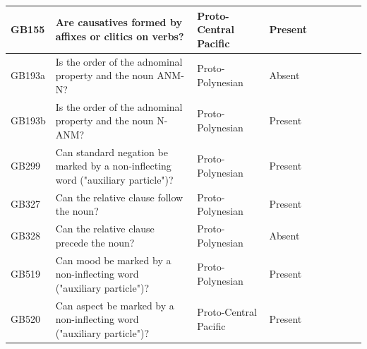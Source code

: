 \documentclass[a4paper,10pt]{article} %
\begin{document}
\begin{landscape}
\begin{longtable}{| p{2cm}| p{3cm}| p{2.5cm}|p{2cm}|p{2cm}|p{2cm}|p{2cm}|p{2cm}|p{2cm}|}
GB155&Are causatives formed by affixes or clitics on verbs?&Proto-Central Pacific&Present&\citet[352]{pawley1970change}& \cellcolor{hedvig_lightgreen!50}{True Positive} & \cellcolor{hedvig_lightgreen!50}{True Positive} & \cellcolor{hedvig_lightgreen!50}{True Positive} & \cellcolor{hedvig_lightgreen!50}{True Positive} \\ \hline
GB193a&Is the order of the adnominal property and the noun ANM-N?&Proto-Polynesian&Absent&\citet[xiv]{clark1976aspects}& \cellcolor{hedvig_lightgreen!50}{True Negative} & \cellcolor{hedvig_yellow!50}{True Negative} & \cellcolor{hedvig_yellow!50}{True Negative} & \cellcolor{hedvig_yellow!50}{True Negative} \\ \hline
GB193b&Is the order of the adnominal property and the noun N-ANM?&Proto-Polynesian&Present&\citet[495]{ross2004morphosyntactic}& \cellcolor{hedvig_lightgreen!50}{True Positive} & \cellcolor{hedvig_lightgreen!50}{True Positive} & \cellcolor{hedvig_lightgreen!50}{True Positive} & \cellcolor{hedvig_lightgreen!50}{True Positive} \\ \hline
GB299&Can standard negation be marked by a non-inflecting word ("auxiliary particle")?&Proto-Polynesian&Present&\citet[130]{clark1976aspects}& \cellcolor{hedvig_lightgreen!50}{True Positive} & \cellcolor{hedvig_lightgreen!50}{True Positive} & \cellcolor{hedvig_lightgreen!50}{True Positive} & \cellcolor{hedvig_lightgreen!50}{True Positive} \\ \hline
GB327&Can the relative clause follow the noun?&Proto-Polynesian&Present&\citet[74]{clark1976aspects}& \cellcolor{hedvig_lightgreen!50}{True Positive} & \cellcolor{hedvig_lightgreen!50}{True Positive} & \cellcolor{hedvig_lightgreen!50}{True Positive} & \cellcolor{hedvig_lightgreen!50}{True Positive} \\ \hline
GB328&Can the relative clause precede the noun?&Proto-Polynesian&Absent&\citet[74]{clark1976aspects}& \cellcolor{hedvig_lightgreen!50}{True Negative} & \cellcolor{hedvig_yellow!50}{True Negative} & \cellcolor{hedvig_yellow!50}{True Negative} & \cellcolor{hedvig_yellow!50}{True Negative} \\ \hline
GB519&Can mood be marked by a non-inflecting word ("auxiliary particle")?&Proto-Polynesian&Present&\citet[20]{chung1978}& \cellcolor{hedvig_lightgreen!50}{True Positive} & \cellcolor{hedvig_lightgreen!50}{True Positive} & \cellcolor{hedvig_lightgreen!50}{True Positive} & \cellcolor{hedvig_lightgreen!50}{True Positive} \\ \hline
GB520&Can aspect be marked by a non-inflecting word ("auxiliary particle")?&Proto-Central Pacific&Present&\citet[347]{pawley1970change}& \cellcolor{hedvig_lightgreen!50}{True Positive} & \cellcolor{hedvig_lightgreen!50}{True Positive} & \cellcolor{hedvig_lightgreen!50}{True Positive} & \cellcolor{hedvig_lightgreen!50}{True Positive} \\ \hline

\end{longtable}
\end{landscape}
\end{document}
